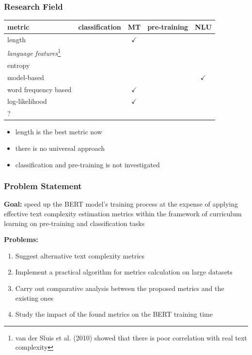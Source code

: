 \documentclass{beamer}
\begin{document}
\begin{frame}
	\frametitle{Research Field}
	\begin{table}
		\begin{tabular}{l|cccc}
			metric & classification & MT & pre-training & NLU \\
			\hline
			length & & $\checkmark$ & & \\
			{\it language features}\footnote[1]{van der Sluis et al. (2010) showed that there is poor correlation with real text complexity} & & & & \\
			entropy & & & & \\
			model-based & & & & $\checkmark$ \\
			word frequency based & & $\checkmark$ & & \\
			log-likelihood & & $\checkmark$ & & \\
			\hline
			? & & & & \\
			\hline
		\end{tabular}
	\end{table}
	\begin{itemize}
		\item length is the best metric now
		\item there is no universal approach
		\item classification and pre-training is not investigated
	\end{itemize}
\end{frame}

\begin{frame}
	\frametitle{Problem Statement}
	{\bf Goal:} speed up the BERT model’s training process at the
	expense of applying effective text complexity estimation metrics within the framework of
	curriculum learning on pre-training and classification tasks
	
	{\bf Problems:}
	\begin{enumerate}
		\item Suggest alternative text complexity metrics
		\item Implement a practical algorithm for metrics calculation on large datasets
		\item Carry out comparative analysis between the proposed metrics
		and the existing ones
		\item Study the impact of the found metrics on the BERT training
		time
	\end{enumerate}
\end{frame}
\end{document}
